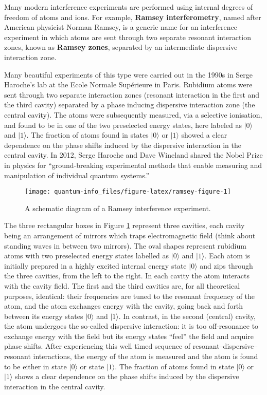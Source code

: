 \documentclass[fleqn]{article}
\begin{document}
Many modern interference experiments are performed using internal degrees of freedom of atoms and ions.
For example, \textbf{Ramsey interferometry}, named after American physicist Norman Ramsey, is a generic name for an interference experiment in which atoms are sent through two separate resonant interaction zones, known as \textbf{Ramsey zones}, separated by an intermediate dispersive interaction zone.

Many beautiful experiments of this type were carried out in the 1990s in Serge Haroche's lab at the Ecole Normale Supérieure in Paris.
Rubidium atoms were sent through two separate interaction zones (resonant interaction in the first and the third cavity) separated by a phase inducing dispersive interaction zone (the central cavity).
The atoms were subsequently measured, via a selective ionisation, and found to be in one of the two preselected energy states, here labeled as \(|0\rangle\) and \(|1\rangle\).
The fraction of atoms found in states \(|0\rangle\) or \(|1\rangle\) showed a clear dependence on the phase shifts induced by the dispersive interaction in the central cavity.
In 2012, Serge Haroche and Dave Wineland shared the Nobel Prize in physics for ``ground-breaking experimental methods that enable measuring and manipulation of individual quantum systems.''



\begin{figure}[H]

{\centering \texttt{[image: quantum-info\_files/figure-latex/ramsey-figure-1]} 

}

\caption{A schematic diagram of a Ramsey interference experiment.}\label{fig:ramsey-figure}
\end{figure}

The three rectangular boxes in Figure \ref{fig:ramsey-figure} represent three cavities, each cavity being an arrangement of mirrors which traps electromagnetic field (think about standing waves in between two mirrors).
The oval shapes represent rubidium atoms with two preselected energy states labelled as \(|0\rangle\) and \(|1\rangle\).
Each atom is initially prepared in a highly excited internal energy state \(|0\rangle\) and zips through the three cavities, from the left to the right.
In each cavity the atom interacts with the cavity field.
The first and the third cavities are, for all theoretical purposes, identical: their frequencies are tuned to the resonant frequency of the atom, and the atom exchanges energy with the cavity, going back and forth between its energy states \(|0\rangle\) and \(|1\rangle\).
In contrast, in the second (central) cavity, the atom undergoes the so-called dispersive interaction: it is too off-resonance to exchange energy with the field but its energy states ``feel'' the field and acquire phase shifts.
After experiencing this well timed sequence of resonant--dispersive--resonant interactions, the energy of the atom is measured and the atom is found to be either in state \(|0\rangle\) or state \(|1\rangle\).
The fraction of atoms found in state \(|0\rangle\) or \(|1\rangle\) shows a clear dependence on the phase shifts induced by the dispersive interaction in the central cavity.
\end{document}
